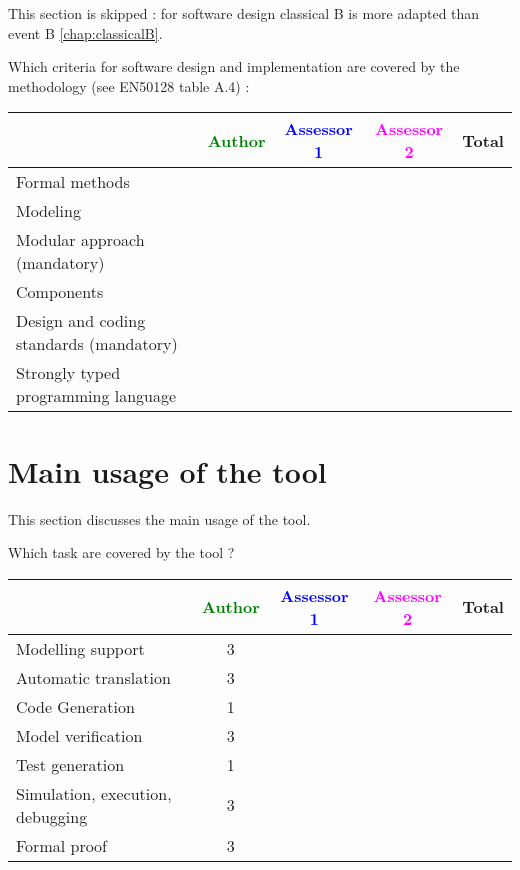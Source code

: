 \begin{author_comment}
This section is skipped :  for software design classical B is more adapted than event B \ref{chap:classicalB}.
\end{author_comment}


Which criteria for software design and implementation are covered by the methodology
(see EN50128 table A.4) :

\begin{tabular}{|l | c | c | c | c|}
\hline
& \textcolor{green}{Author} & \textcolor{blue}{Assessor 1} & \textcolor{magenta}{Assessor 2} & Total \\
\hline
Formal methods  & & & &  \\
\hline 
Modeling  & & & &  \\
\hline
Modular approach (mandatory) & & & &  \\
\hline
Components & & & &  \\
\hline
Design and coding standards (mandatory) & & & &  \\
\hline
Strongly typed programming language & & & &  \\
\hline

\end{tabular}



\section{Main usage of the tool}
\label{main_usage}

This section discusses the main usage of the tool.

Which task are covered by the tool ?


\begin{tabular}{|l | c | c | c | c|}
\hline
& \textcolor{green}{Author} & \textcolor{blue}{Assessor 1} & \textcolor{magenta}{Assessor 2} & Total \\
\hline 
Modelling support & 3 & & &  \\
\hline
Automatic translation  & 3 & & & \\
\hline
Code Generation  & 1 & & & \\
\hline
Model verification & 3 & & & \\
\hline
Test generation & 1 & & & \\
\hline
Simulation, execution, debugging & 3 & & & \\
\hline
Formal proof & 3 & & & \\
\hline
\end{tabular}

